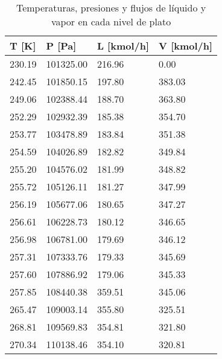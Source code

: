 \newpage
\begin{table}[ht]
    \centering\small
    \caption{Temperaturas, presiones y flujos de líquido y vapor en cada nivel de plato}
    \begin{tabular}{|p{3cm}|p{3cm}|p{3cm}|p{3cm}|}
        \hline
        \textbf{T [K]} & \textbf{P [Pa]} & \textbf{L [kmol/h]} & \textbf{V [kmol/h]} \\ \hline
        230.19         & 101325.00       & 216.96              & 0.00                \\ \hline
        242.45         & 101850.15       & 197.80              & 383.03              \\ \hline
        249.06         & 102388.44       & 188.70              & 363.80              \\ \hline
        252.29         & 102932.39       & 185.38              & 354.70              \\ \hline
        253.77         & 103478.89       & 183.84              & 351.38              \\ \hline
        254.59         & 104026.89       & 182.82              & 349.84              \\ \hline
        255.20         & 104576.02       & 181.99              & 348.82              \\ \hline
        255.72         & 105126.11       & 181.27              & 347.99              \\ \hline
        256.19         & 105677.06       & 180.65              & 347.27              \\ \hline
        256.61         & 106228.73       & 180.12              & 346.65              \\ \hline
        256.98         & 106781.00       & 179.69              & 346.12              \\ \hline
        257.31         & 107333.76       & 179.33              & 345.69              \\ \hline
        257.60         & 107886.92       & 179.06              & 345.33              \\ \hline
        257.85         & 108440.38       & 359.51              & 345.06              \\ \hline
        265.47         & 109003.14       & 355.80              & 325.51              \\ \hline
        268.81         & 109569.83       & 354.81              & 321.80              \\ \hline
        270.34         & 110138.46       & 354.10              & 320.81              \\ \hline

\end{tabular}
\end{table}
